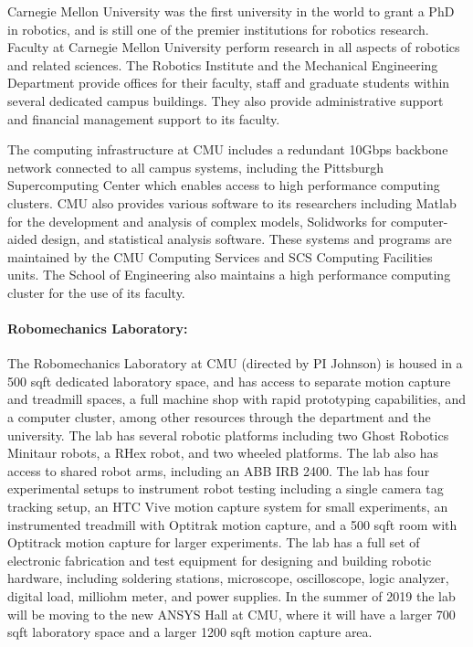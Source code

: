 \documentclass[11pt]{article}
\begin{document}

Carnegie Mellon University was the first university in the world to grant a PhD in robotics, and is still one of the premier institutions for robotics research. Faculty at Carnegie Mellon University perform research in all aspects of robotics and related sciences. The Robotics Institute and the Mechanical Engineering Department provide offices for their faculty, staff and graduate students within several dedicated campus buildings. They also provide administrative support and financial management support to its faculty.  

The computing infrastructure at CMU includes a redundant 10Gbps backbone network connected
to all campus systems, including the Pittsburgh Supercomputing Center which enables access to high
performance computing clusters. CMU also provides various software to its researchers including
Matlab for the development and analysis of complex models, Solidworks for computer-aided
design, and statistical analysis software. These systems and programs are maintained by the CMU
Computing Services and SCS Computing Facilities units. The School of Engineering also maintains
a high performance computing cluster for the use of its faculty.


\paragraph{Robomechanics Laboratory:}
The Robomechanics Laboratory at CMU (directed by PI Johnson) is housed in a 500 sqft dedicated laboratory space, and has access to separate motion
capture and treadmill spaces, a full machine shop with rapid prototyping capabilities, and a computer
cluster, among other resources through the department and the university. The lab has several robotic
platforms including two Ghost Robotics Minitaur robots, a RHex robot, and two wheeled platforms.
The lab also has access to shared robot arms, including an ABB IRB 2400. The lab has four
experimental setups to instrument robot testing including a single camera tag tracking setup, an
HTC Vive motion capture system for small experiments, an instrumented treadmill with Optitrak
motion capture, and a 500 sqft room with Optitrack motion capture for larger experiments. The lab
has a full set of electronic fabrication and test equipment for designing and building robotic hardware,
including soldering stations, microscope, oscilloscope, logic analyzer, digital load, milliohm meter,
and power supplies. In the summer of 2019 the lab will be moving to the new ANSYS Hall at CMU, where it will have a larger 700 sqft laboratory space and a larger 1200 sqft motion capture area. 
\end{document}

